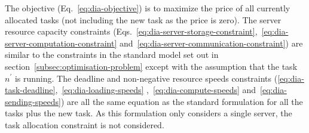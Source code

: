 The objective (Eq.~\eqref{eq:dia-objective}) is to maximize the price of all currently allocated tasks (not including
the new task as the price is zero). The server resource capacity constraints
(Eqs.~\eqref{eq:dia-server-storage-constraint},~\eqref{eq:dia-server-computation-constraint}
and~\eqref{eq:dia-server-communication-constraint}) are similar to the constraints in the standard model set out in
section~\ref{subsec:optimisation-problem} except with the assumption that the task $n^{'}$ is running. The deadline and
non-negative resource speeds constraints (\ref{eq:dia-task-deadline},~\ref{eq:dia-loading-speeds}
,~\ref{eq:dia-compute-speeds} and~\ref{eq:dia-sending-speeds}) are all the same equation as the standard formulation
for all the tasks plus the new task. As this formulation only considers a single server, the task allocation constraint
is not considered.

